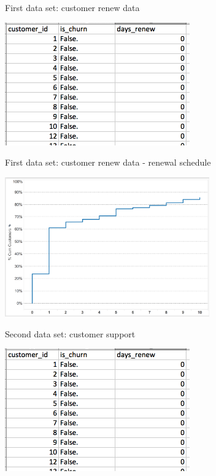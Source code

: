 \documentclass[10pt]{beamer}
\begin{document}
    \begin{frame}{First data set: customer renew data}
      \begin{center}
        \includegraphics[height=150pt]{graphs/dataset_customer_renew}
      \end{center}
    \end{frame}
    
    \begin{frame}{First data set: customer renew data - renewal schedule}
      \begin{center}
        \includegraphics[width=250pt]{graphs/dataset_renewal_schedule}
      \end{center}
    \end{frame}

    \begin{frame}{Second data set: customer support}
      \begin{center}
        \includegraphics[height=150pt]{graphs/dataset_customer_renew}
      \end{center}
    \end{frame}
\end{document}
